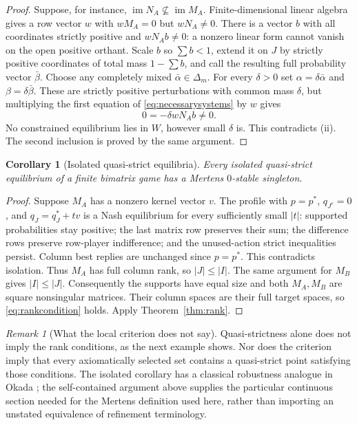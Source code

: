 \documentclass[11pt]{article}
\newcommand{\im}{\operatorname{im}}
\newtheorem{corollary}[theorem]{Corollary}
\theoremstyle{definition}
\theoremstyle{remark}
\newtheorem{remark}[theorem]{Remark}
\begin{document}
\begin{proof}
Suppose, for instance, $\im N_A\not\subseteq\im M_A$. Finite-dimensional
linear algebra gives a row vector $w$ with $wM_A=0$ but $wN_A\ne0$.
There is a vector $b$ with all coordinates strictly positive and
$wN_A b\ne0$: a nonzero linear form cannot vanish on the open positive
orthant. Scale $b$ so $\sum b<1$, extend it on $J$ by strictly positive
coordinates of total mass $1-\sum b$, and call the resulting full
probability vector $\bar\beta$. Choose any completely mixed
$\bar\alpha\in\Delta_m$.
For every $\delta>0$ set $\alpha=\delta\bar\alpha$ and
$\beta=\delta\bar\beta$. These are strictly positive perturbations with
common mass $\delta$, but multiplying the first equation of
\eqref{eq:necessarysystems} by $w$ gives
\[
 0=-\delta wN_A b\ne0.
\]
No constrained equilibrium lies in $W$, however small $\delta$ is. This
contradicts (ii). The second inclusion is proved by the same argument.
\end{proof}

\begin{corollary}[Isolated quasi-strict equilibria]\label{cor:isolated}
Every isolated quasi-strict equilibrium of a finite bimatrix game has a
Mertens $0$-stable singleton.
\end{corollary}
\begin{proof}
Suppose $M_A$ has a nonzero kernel vector $v$. The profile with $p=p^*$,
$q_{J^c}=0$, and $q_J=q_J^*+tv$ is a Nash equilibrium for every sufficiently
small $|t|$: supported probabilities stay positive; the last matrix row
preserves their sum; the difference rows preserve row-player indifference;
and the unused-action strict inequalities persist. Column best replies are
unchanged since $p=p^*$. This contradicts isolation. Thus $M_A$ has full
column rank, so $|J|\le|I|$. The same argument for $M_B$ gives
$|I|\le|J|$. Consequently the supports have equal size and both $M_A,M_B$
are square nonsingular matrices. Their column spaces are their full target
spaces, so \eqref{eq:rankcondition} holds. Apply Theorem~\ref{thm:rank}.
\end{proof}

\begin{remark}[What the local criterion does not say]
Quasi-strictness alone does not imply the rank conditions, as the next
example shows. Nor does the criterion imply that every axiomatically selected
set contains a quasi-strict point satisfying those conditions. The isolated
corollary has a classical robustness analogue in Okada \cite{okada}; the
self-contained argument above supplies the particular continuous section
needed for the Mertens definition used here, rather than importing an
unstated equivalence of refinement terminology.
\end{remark}
\end{document}
